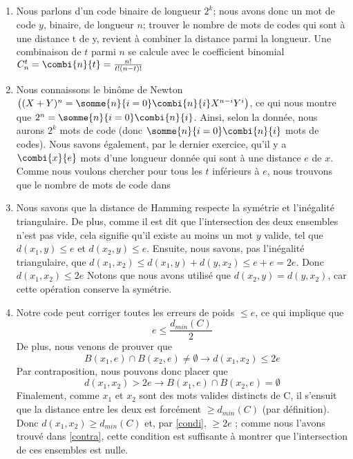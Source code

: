 \documentclass[10p,a4paper]{scrartcl}
\renewcommand{\(}{\left(}
\renewcommand{\)}{\right)}
\begin{document}
\subsection{}
\begin{enumerate}
	\item 	Nous parlons d'un code binaire de longueur $2^k$; nous avons donc un mot de code $y$, binaire, de longueur $n$; trouver le nombre de mots de codes qui sont à une distance t de y, revient à combiner la distance parmi la longueur. Une combinaison de $t$ parmi $n$ se calcule avec le coefficient binomial $C^t_n = \combi{n}{t} = \frac{n!}{t!(n-t)!}$
	
	\item 	Nous connaissons le binôme de Newton $ \((X+Y)^n = \somme{n}{i=0}\combi{n}{i}X^{n-i}Y^i\)$, ce qui nous montre que $2^n = \somme{n}{i=0}\combi{n}{i}$. Ainsi, selon la donnée, nous aurons $2^k$ mots de code (donc $\somme{n}{i=0}\combi{n}{i}$ mots de codes). Nous savons également, par le dernier exercice, qu'il y a $\combi{x}{e}$ mots d'une longueur donnée qui sont à une distance $e$ de $x$. Comme nous voulons chercher pour tous les $t$ inférieurs à $e$, nous trouvons que le nombre de mots de code dans 
	
	\item 	Nous savons que la distance de Hamming respecte la symétrie et l'inégalité triangulaire. De plus, comme il est dit que l'intersection des deux ensembles n'est pas vide, cela signifie qu'il existe au moins un mot $y$ valide, tel que $d(x_1,y) \leq e$ et $d(x_2,y) \leq e$. Ensuite, nous savons, pas l'inégalité triangulaire, que $d(x_1,x_2) \leq d(x_1,y) + d(y,x_2) \leq e+e = 2e$. Donc $d(x_1,x_2) \leq 2e$ Notons que nous avons utilisé que $d(x_2,y) = d(y,x_2)$, car cette opération conserve la symétrie.
	
	\item 	Notre code peut corriger toutes les erreurs de poids $\leq e$, ce qui implique que 
			\begin{equation}
				e \leq \frac{d_{min}(C)}{2}
				\label{condi}
			\end{equation}
			De plus, nous venons de prouver que 
			\begin{equation}
				B(x_1,e) \cap B(x_2,e) \neq \emptyset \longrightarrow d(x_1,x_2) \leq 2e
				\label{base}
			\end{equation}
			Par contraposition, nous pouvons donc placer que 
			\begin{equation}
				d(x_1,x_2) > 2e \longrightarrow B(x_1,e) \cap B(x_2,e) = \emptyset
				\label{contra}
			\end{equation}
			Finalement, comme $x_1$ et $x_2$ sont des mots valides distincts de C, il s'ensuit que la distance entre les deux est forcément $\geq d_{min}(C)$ (par définition). Donc $d(x_1,x_2) \geq d_{min}(C)$ et, par \eqref{condi}, $\geq 2e$ ; comme nous l'avons trouvé dans \eqref{contra}, cette condition est suffisante à montrer que l'intersection de ces ensembles est nulle.
			

\end{enumerate}
\end{document}
